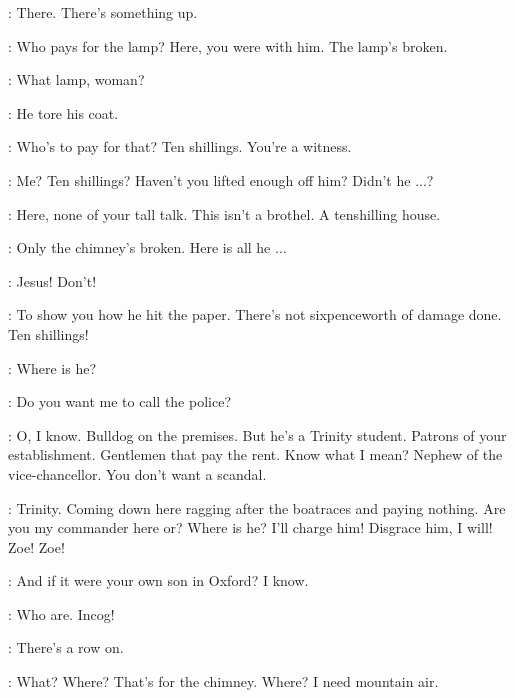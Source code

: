 \Zoe:
There.
There's something up.

\Bella:
Who pays for the lamp?
Here, you were with him.
The lamp's broken.

\Bloom:
What lamp, woman?

\AWhore:
He tore his coat.

\Bella:
Who's to pay for that?
Ten shillings.
You're a witness.

\Bloom:
Me? Ten shillings?
Haven't you lifted enough off him?
Didn't he ...?

\Bella:
Here, none of your tall talk.
This isn't a brothel.
A tenshilling house.

\Bloom:
Only the chimney's broken.
Here is all he ...

\Bella:
Jesus!
Don't!

\Bloom:
To show you how he hit the paper.
There's not sixpenceworth of damage done.
Ten shillings!

\Florry:
Where is he?

\Bella:
Do you want me to call the police?

\Bloom:
O, I know.
Bulldog on the premises.
But he's a Trinity student.
Patrons of your establishment.
Gentlemen that pay the rent.
Know what I mean?
Nephew of the vice-chancellor.
You don't want a scandal.%

\Bella:
Trinity.
Coming down here ragging after the boatraces and paying nothing.
Are you my commander here or?
Where is he?
I'll charge him!
Disgrace him, I will!
Zoe! Zoe!

\Bloom:
And if it were your own son in Oxford?
I know.

\Bella:
Who are.
Incog!

\Zoe:
There's a row on.

\Bloom:
What? Where?
That's for the chimney.
Where?
I need mountain air.


